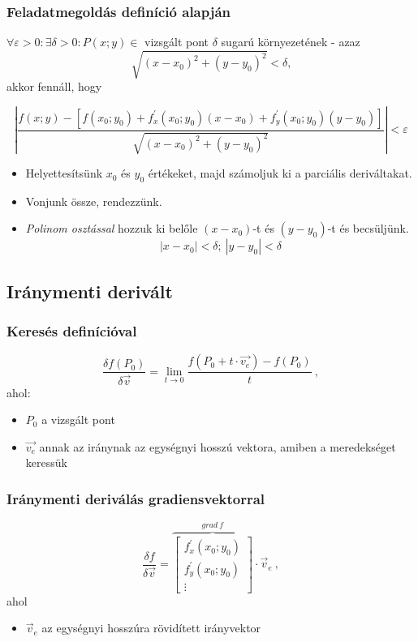 \newpage

\subsubsection*{Feladatmegoldás definíció alapján}

$\forall \varepsilon > 0: \exists \delta > 0: P(x;y) \in$ vizsgált pont $\delta$ sugarú környezetének - azaz
\[
  \sqrt{(x-x_0)^2 + (y-y_0)^2} < \delta \text{,}
\]
akkor fennáll, hogy

\begin{equation}
  \left| \frac{f(x;y) - \left[ f(x_0;y_0) + f^{'}_x(x_0;y_0)(x-x_0) + f^{'}_y(x_0;y_0)(y-y_0)  \right]}{\sqrt{(x-x_0)^2 + (y-y_0)^2}} \right| < \varepsilon
\end{equation}
\begin{itemize}
\item Helyettesítsünk $x_0$ és $y_0$ értékeket, majd számoljuk ki a parciális deriváltakat.
\item Vonjunk össze, rendezzünk.
\item \emph{Polinom osztással} hozzuk ki belőle $(x-x_0)$-t és $(y-y_0)$-t és becsüljünk.
  \[
    |x-x_0| < \delta;\ |y-y_0| < \delta
  \]
\end{itemize}

\subsection*{Iránymenti derivált}
\subsubsection*{Keresés definícióval}
\begin{equation}
  \frac{\delta f(P_0)}{\delta \vec{v}} = \lim_{t \rightarrow 0} \frac{f(P_0 + t \cdot \vec{v_e}) - f(P_0)}{t}\ ,
\end{equation}
ahol:
\begin{itemize}
\item $P_0$ a vizsgált pont
\item $\vec{v_e}$ annak az iránynak az egységnyi hosszú vektora, amiben a meredekséget keressük
\end{itemize}
\subsubsection*{Iránymenti deriválás gradiensvektorral}
\begin{equation}
  \frac{\delta f}{\delta \vec{v}} = \overbrace{
    \begin{bmatrix}
      f^{'}_x(x_0;y_0) \\
      f^{'}_y(x_0;y_0) \\
      \vdots
    \end{bmatrix}}^{grad\ f} \cdot \vec{v}_e \ ,
\end{equation}
ahol
\begin{itemize}
\item $\vec{v}_e$ az egységnyi hosszúra rövidített irányvektor
\end{itemize}
